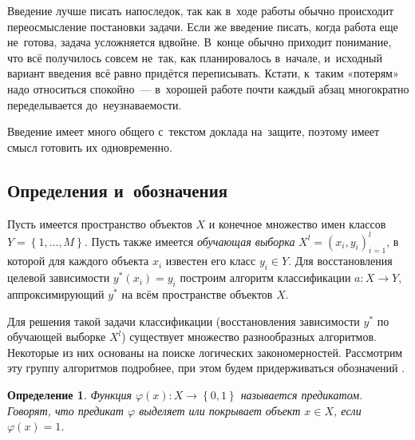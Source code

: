 \documentclass[12pt]{article}
\newtheorem{definition}{Определение}
\begin{document}
Введение лучше писать напоследок, так как в~ходе работы обычно
происходит переосмысление постановки задачи.  Если же введение писать,
когда работа еще не~готова, задача усложняется вдвойне.  В~конце
обычно приходит понимание, что всё получилось совсем не~так, как
планировалось в~начале, и~исходный вариант введения всё равно придётся
переписывать.  Кстати, к~таким «потерям» надо относиться спокойно~---
в~хорошей работе почти каждый абзац многократно переделывается
до~неузнаваемости.

Введение имеет много общего с~текстом доклада на~защите, поэтому имеет
смысл готовить их одновременно.

\subsection{Определения и~обозначения}
\label{subsec:defs}



Пусть имеется пространство объектов \(X\) и конечное множество имен
классов \(Y = \left\{1, \dots, M\right\}\). Пусть также имеется
\emph{обучающая выборка} \(X^{l} = (x_i, y_i)_{i = 1}^{l}\), в которой
для каждого объекта \(x_i\) известен его класс \(y_i \in Y\).  Для
восстановления целевой зависимости \(y^{*}(x_i) = y_i\) построим
алгоритм классификации \(a\colon X \rightarrow Y\), аппроксимирующий
\(y^{*}\) на всём пространстве объектов \(X\).

Для решения такой задачи классификации (восстановления зависимости
\(y^{*}\) по обучающей выборке \(X^l\)) существует множество
разнообразных алгоритмов. Некоторые из них основаны на поиске
логических закономерностей. Рассмотрим эту группу алгоритмов
подробнее, при этом будем придерживаться обозначений
\cite{voron10logicalgs}.

\begin{definition}
  Функция \(\varphi(x) \colon X \rightarrow \left\{0, 1\right\}\)
  называется \emph{предикатом}. Говорят, что предикат
  \(\varphi\) \emph{выделяет} или \emph{покрывает} объект \(x \in X\),
  если \(\varphi(x) = 1\).
\end{definition}
\end{document}
